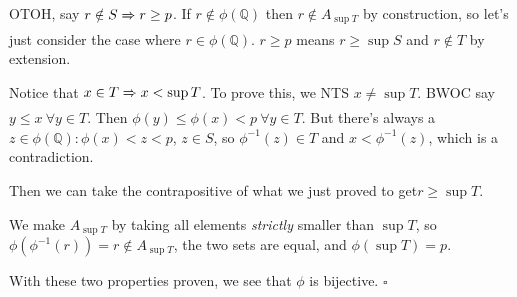 \documentclass[12pt]{article}
\newcommand{\ra}{\xRightarrow}
\newcommand{\Q}{\mathbb{Q}}
\begin{document}
OTOH, say $r \notin S \ra{} r \ge p$.
If $r \notin \phi(\Q)$ then $r \notin A_{\sup T}$ by construction, so
let's just consider the case where $r \in \phi(\Q)$.
$r \ge p$ means $r \ge \sup S$ and $r \notin T$ by extension.

Notice that $x \in T \ra{} x < \sup T$.
To prove this, we NTS $x \ne \sup T$.
BWOC say $y \le x\ \forall y \in T$.
Then $\phi(y) \le \phi(x) < p\ \forall y \in T$.
But there's always a $z \in \phi(\Q): \phi(x) < z < p$,
$z \in S$, so $\phi^{-1}(z) \in T$ and $x < \phi^{-1}(z)$, which is a contradiction.

Then we can take the contrapositive of what we just proved to get$r \ge \sup T$.

We make $A_{\sup T}$ by taking all elements \textit{strictly} smaller than $\sup T$,
so $\phi\left(\phi^{-1}(r)\right)=r \notin A_{\sup T}$,
the two sets are equal, and $\phi(\sup T)=p$.

With these two properties proven, we see that $\phi$ is bijective. $\square$
\end{document}
